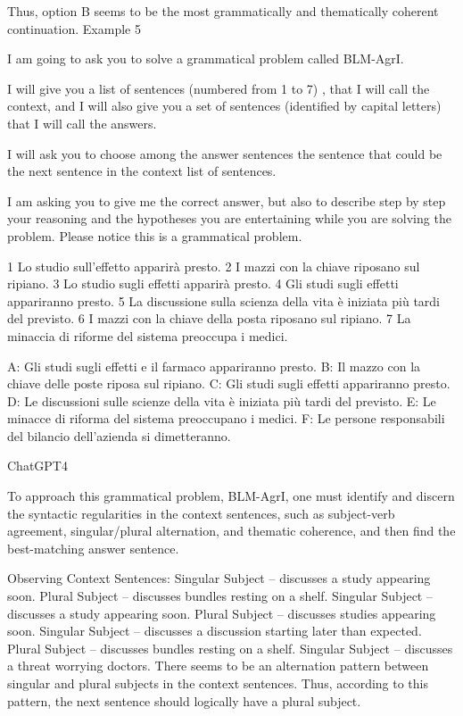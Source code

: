 Thus, option B seems to be the most grammatically and thematically coherent continuation.
Example 5

I am going to ask you to solve a grammatical problem called BLM-AgrI.  

I will give you a list of sentences (numbered from 1 to 7) , that I will call the context, and I will also give you a set of sentences (identified by capital letters) that I will call  the answers. 

I will ask you to choose among the answer sentences the sentence that could be the next sentence in the context list of sentences.

I am asking you to give me the correct answer, but also to describe step by step  your reasoning and the hypotheses you are entertaining while you are solving the problem. Please notice this is a grammatical problem.

1 Lo studio sull'effetto apparirà presto.
2 I mazzi con la chiave riposano sul  ripiano.
3 Lo studio sugli effetti apparirà presto.
4 Gli studi sugli effetti appariranno presto.
5 La discussione sulla scienza della vita è iniziata più tardi del previsto.
6 I mazzi con la chiave della posta riposano sul ripiano.
7 La minaccia di riforme del sistema preoccupa i medici.

A: Gli studi sugli effetti e il farmaco appariranno presto.
B: Il mazzo con la chiave delle poste riposa sul ripiano.
C: Gli studi sugli effetti appariranno presto.
D: Le discussioni sulle scienze della vita  è iniziata più tardi del previsto.
E: Le minacce di riforma del sistema preoccupano i medici.
F: Le persone responsabili del bilancio dell'azienda si dimetteranno.

ChatGPT4

To approach this grammatical problem, BLM-AgrI, one must identify and discern the syntactic regularities in the context sentences, such as subject-verb agreement, singular/plural alternation, and thematic coherence, and then find the best-matching answer sentence.

Observing Context Sentences:
Singular Subject – discusses a study appearing soon.
Plural Subject – discusses bundles resting on a shelf.
Singular Subject – discusses a study appearing soon.
Plural Subject – discusses studies appearing soon.
Singular Subject – discusses a discussion starting later than expected.
Plural Subject – discusses bundles resting on a shelf.
Singular Subject – discusses a threat worrying doctors.
There seems to be an alternation pattern between singular and plural subjects in the context sentences. Thus, according to this pattern, the next sentence should logically have a plural subject.

